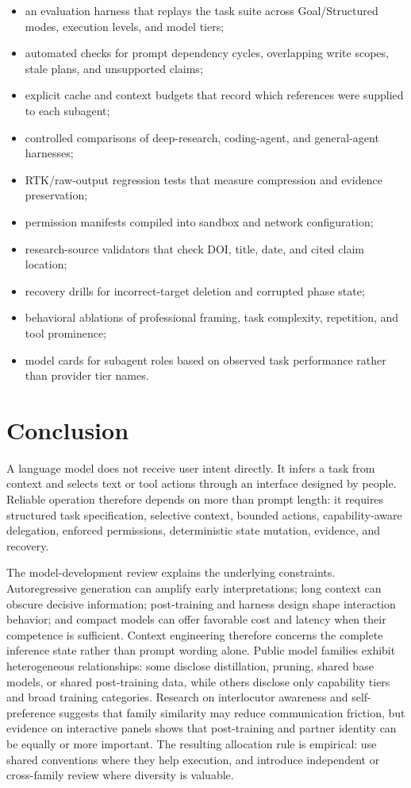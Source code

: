 \documentclass[11pt,a4paper]{article}
\begin{document}
\begin{itemize}
  \item an evaluation harness that replays the task suite across Goal/Structured modes, execution levels, and model tiers;
  \item automated checks for prompt dependency cycles, overlapping write scopes, stale plans, and unsupported claims;
  \item explicit cache and context budgets that record which references were supplied to each subagent;
  \item controlled comparisons of deep-research, coding-agent, and general-agent harnesses;
  \item RTK/raw-output regression tests that measure compression and evidence preservation;
  \item permission manifests compiled into sandbox and network configuration;
  \item research-source validators that check DOI, title, date, and cited claim location;
  \item recovery drills for incorrect-target deletion and corrupted phase state;
  \item behavioral ablations of professional framing, task complexity, repetition, and tool prominence;
  \item model cards for subagent roles based on observed task performance rather than provider tier names.
\end{itemize}

\section{Conclusion}\label{sec:conclusion}

A language model does not receive user intent directly. It infers a task from context and selects text or tool actions through an interface designed by people. Reliable operation therefore depends on more than prompt length: it requires structured task specification, selective context, bounded actions, capability-aware delegation, enforced permissions, deterministic state mutation, evidence, and recovery.

The model-development review explains the underlying constraints. Autoregressive generation can amplify early interpretations; long context can obscure decisive information; post-training and harness design shape interaction behavior; and compact models can offer favorable cost and latency when their competence is sufficient. Context engineering therefore concerns the complete inference state rather than prompt wording alone. Public model families exhibit heterogeneous relationships: some disclose distillation, pruning, shared base models, or shared post-training data, while others disclose only capability tiers and broad training categories. Research on interlocutor awareness and self-preference suggests that family similarity may reduce communication friction, but evidence on interactive panels shows that post-training and partner identity can be equally or more important. The resulting allocation rule is empirical: use shared conventions where they help execution, and introduce independent or cross-family review where diversity is valuable.
\end{document}

